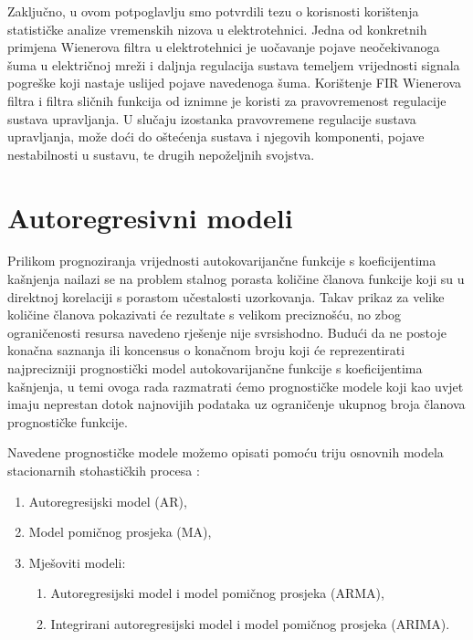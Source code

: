 \documentclass[a4paper,12pt,oneside]{memoir}
\begin{document}
                Zaključno, u ovom potpoglavlju smo potvrdili tezu o korisnosti korištenja statističke analize vremenskih nizova u elektrotehnici. Jedna od konkretnih primjena Wienerova filtra u elektrotehnici je uočavanje pojave neočekivanoga šuma u električnoj mreži i daljnja regulacija sustava temeljem vrijednosti signala pogreške koji nastaje uslijed pojave navedenoga šuma. Korištenje FIR Wienerova filtra i filtra sličnih funkcija od iznimne je koristi za pravovremenost regulacije sustava upravljanja. U slučaju izostanka pravovremene regulacije sustava upravljanja, može doći do oštećenja sustava i njegovih komponenti, pojave nestabilnosti u sustavu, te drugih nepoželjnih svojstva.


    \chapter{Autoregresivni modeli}
            
        Prilikom prognoziranja vrijednosti autokovarijančne funkcije s koeficijentima kašnjenja nailazi se na problem stalnog porasta količine članova funkcije koji su u direktnoj korelaciji s porastom učestalosti uzorkovanja. Takav prikaz za velike količine članova pokazivati će rezultate s velikom preciznošću, no zbog ograničenosti resursa navedeno rješenje nije svrsishodno. Budući da ne postoje konačna saznanja ili koncensus o konačnom broju koji će reprezentirati najprecizniji prognostički model autokovarijančne funkcije s koeficijentima kašnjenja, u temi ovoga rada razmatrati ćemo prognostičke modele koji kao uvjet imaju neprestan dotok najnovijih podataka uz ograničenje ukupnog broja članova prognostičke funkcije.

        Navedene prognostičke modele možemo opisati pomoću triju osnovnih modela stacionarnih stohastičkih procesa \cite{Broersen}:
        
        \begin{enumerate}
            \item Autoregresijski model (AR),
            \item Model pomičnog prosjeka (MA),
            \item Mješoviti modeli:
            \begin{enumerate}
                \item Autoregresijski model i model pomičnog prosjeka (ARMA),
                \item Integrirani autoregresijski model i model pomičnog prosjeka (ARIMA).
            \end{enumerate}
        \end{enumerate}
        
\end{document}
